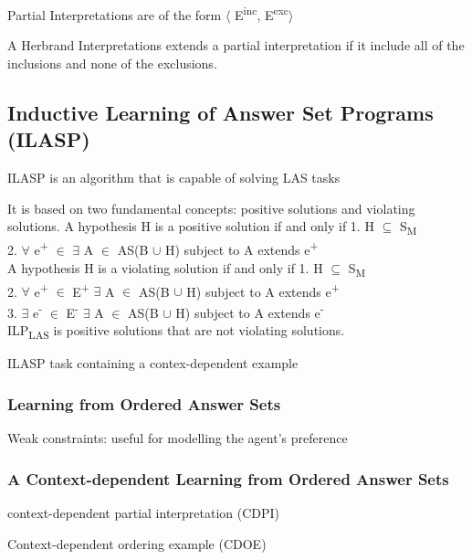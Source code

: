 \documentclass[12pt,twoside]{report}
\begin{document}
Partial Interpretations are of the form $\langle$ E\textsuperscript{inc}, E\textsuperscript{exc}$\rangle$

A Herbrand Interpretations extends a partial interpretation if it include all of the inclusions and none of the exclusions.

\subsection{Inductive Learning of Answer Set Programs (ILASP)}

ILASP is an algorithm that is capable of solving LAS tasks

It is based on two fundamental concepts: positive solutions and violating solutions.
A hypothesis H is a positive solution if and only if
1. H $\subseteq$ S\textsubscript{M} \\
2. $\forall$ e\textsuperscript{+} $\in$ $\exists$ A $\in$ AS(B $\cup$ H) subject to A extends e\textsuperscript{+}\\

A hypothesis H is a violating solution if and only if
1. H $\subseteq$ S\textsubscript{M} \\
2. $\forall$ e\textsuperscript{+} $\in$ E\textsuperscript{+} $\exists$ A $\in$ AS(B $\cup$ H) subject to A extends e\textsuperscript{+}\\
3. $\exists$ e\textsuperscript{-} $\in$ E\textsuperscript{-} $\exists$ A $\in$ AS(B $\cup$ H) subject to A extends e\textsuperscript{-}\\


ILP\textsubscript{LAS} is positive solutions that are not violating solutions.

ILASP task containing a contex-dependent example

\subsubsection{Learning from Ordered Answer Sets}

Weak constraints: useful for modelling the agent's preference

\subsubsection{A Context-dependent Learning from Ordered Answer Sets}


context-dependent partial interpretation (CDPI)


Context-dependent ordering example (CDOE)
\end{document}
